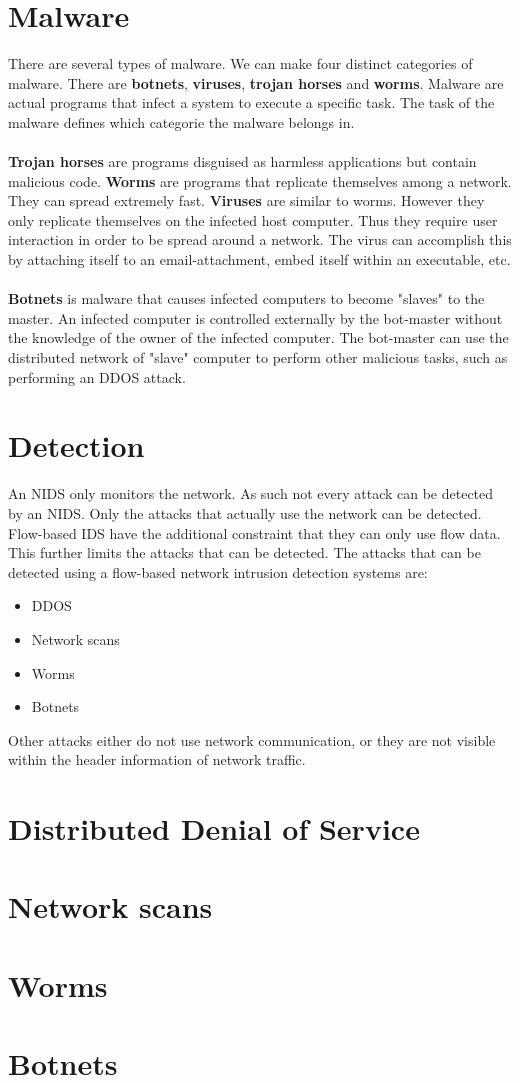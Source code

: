 \section{Malware}
There are several types of malware. We can make four distinct categories of malware. There are \textbf{botnets}, \textbf{viruses}, \textbf{trojan horses} and \textbf{worms}. Malware are actual programs that infect a system to execute a specific task. The task of the malware defines which categorie the malware belongs in.\\
\\
\textbf{Trojan horses} are programs disguised as harmless applications but contain malicious code. \textbf{Worms} are programs that replicate themselves among a network.  They can spread extremely fast. \textbf{Viruses} are similar to worms. However they only replicate themselves on the infected host computer. Thus they require user interaction in order to be spread around a network. The virus can accomplish this by attaching itself to an email-attachment, embed itself within an executable, etc. \\
\\
\textbf{Botnets} is malware that causes infected computers to become "slaves" to the master. An infected computer is controlled externally by the bot-master without the knowledge of the owner of the infected computer. The bot-master can use the distributed network of "slave" computer to perform other malicious tasks, such as performing an DDOS attack.

\section{Detection}
An NIDS only monitors the network. As such not every attack can be detected by an NIDS. Only the attacks that actually use the network can be detected. Flow-based IDS have the additional constraint that they can only use flow data. This further limits the attacks that can be detected. The attacks that can be detected using a flow-based network intrusion detection systems are:
\begin{itemize}
\item DDOS
\item Network scans
\item Worms
\item Botnets
\end{itemize}
Other attacks either do not use network communication, or they are not visible within the header information of network traffic. 

\section{Distributed Denial of Service}

\section{Network scans}

\section{Worms}

\section{Botnets}

